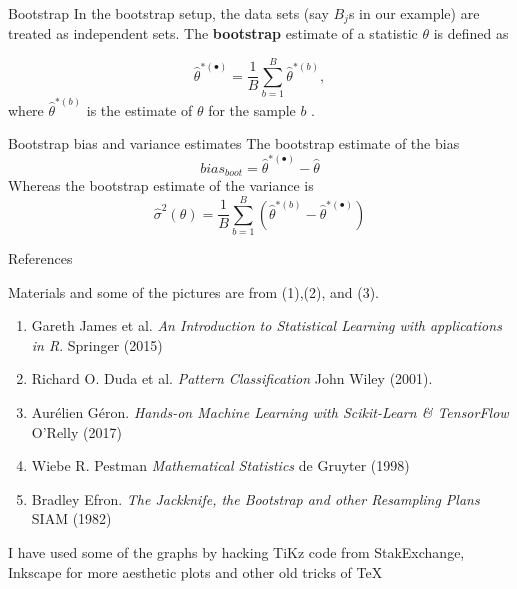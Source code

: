 \documentclass{beamer}
\begin{document}
\begin{frame}{Bootstrap}
	In the bootstrap setup, the data sets (say $B_j$s in our example) are treated as independent sets. The {\bf bootstrap} estimate of a statistic $\theta$ is defined as
	
	\begin{equation*}
		\hat{\theta}^{*(\bullet)}= \frac{1}{B} \sum_{b=1}^B \hat{\theta}^{*(b)},
	\end{equation*}
where $\hat{\theta}^{*(b)}$ is the estimate of $\theta$ for the sample $b$ .
\end{frame}		

\begin{frame}{Bootstrap bias and variance estimates}
	The bootstrap estimate of the bias 
	\begin{equation*}
		bias_{boot}= \hat{\theta}^{*(\bullet)}- \hat{\theta}
	\end{equation*}
	Whereas the bootstrap estimate of the variance is
	\begin{equation*}
		\hat{\sigma}^2 (\theta)= \frac{1}{B}\sum_{b=1}^B \left(  \hat{\theta}^{*(b)} - \hat{\theta}^{*(\bullet)} 
		\right)
	\end{equation*}
\end{frame}
		
	\begin{frame}{References}
		
		Materials and some of the pictures are from (1),(2), and (3).
		\begin{enumerate}
			\item Gareth James et al. {\it An Introduction to Statistical Learning with applications in R}. Springer (2015)
			\item Richard O. Duda et al. {\it Pattern Classification} John Wiley (2001). 
			\item Aur\'elien G\'eron. {\it Hands-on Machine Learning with Scikit-Learn \& TensorFlow} O'Relly (2017)
			\item Wiebe R. Pestman {\it Mathematical Statistics} de Gruyter (1998)
			\item Bradley Efron. {\it The Jackknife, the Bootstrap and other Resampling Plans}  SIAM (1982)
		\end{enumerate}	
		
		I have used some of the graphs by hacking TiKz code from StakExchange, Inkscape for more aesthetic plots and other old tricks of \TeX
	\end{frame}	

	
\end{document}
